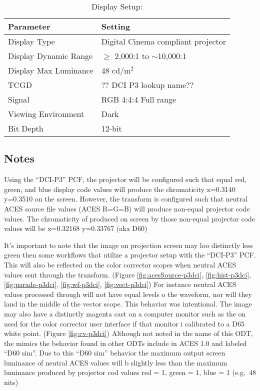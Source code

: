 \begin{table}[ht!]
    \centering
        \begin{tabular}{|p{1.5in}|p{3in}|}
            \hline
            \textbf{Parameter} 		& 	\textbf{Setting} 				 		\\ \hline
            Display Type 			&	Digital Cinema compliant projector 		\\ \hline
            Display Dynamic Range 	& 	$\geq$ 2,000:1 to $\sim$10,000:1 		\\ \hline
            Display Max Luminance 	& 	48 cd/m$^2$								\\ \hline
            TCGD 					& 	?? DCI P3 lookup name?? 				\\ \hline %
            Signal 					&	RGB 4:4:4 Full range 					\\ \hline
            Viewing Environment 	& 	Dark 									\\ \hline
            Bit Depth 				& 	12-bit 									\\ \hline 
    	\end{tabular}
    \caption{Display Setup: \shortName{}} 
    \label{tab:setup-\id}
\end{table}

\subsection{Notes}
\label{subsec:notes-\id}

Using the ``DCI-P3'' PCF, the projector will be configured such that equal red, green, and blue display code values will produce the chromaticity x=0.3140 y=0.3510 on the screen. However, the \transformID{} transform is configured such that neutral ACES source file values (ACES R=G=B) will produce non-equal projector code values. The chromaticity of produced on screen by those non-equal projector code values will be x=0.32168 y=0.33767 (aka D60) 

It's important to note that the image on projection screen may loo distinctly less green then some workflows that utilize a projector setup with the ``DCI-P3'' PCF. This will also be reflected on the color corrector scopes when neutral ACES values sent through the \transformID{} transform. (Figure \ref{fig:acesSource-p3dci}, \ref{fig:hist-p3dci}, \ref{fig:parade-p3dci}, \ref{fig:wf-p3dci}, \ref{fig:vect-p3dci}) For instance neutral ACES values processed through \transformID{} will not have equal levels o the waveform, nor will they land in the middle of the vector scope. This behavior was intentional. The image may also have a distinctly magenta cast on a computer monitor such as the on used for the color corrector user interface if that monitor i calibrated to a D65 white point. (Figure \ref{fig:cv-p3dci}) Although not noted in the name of this ODT, the mimics the behavior found in other ODTs include in ACES 1.0 and labeled ``D60 sim''. Due to this ``D60 sim'' behavior the maximum output screen luminance of neutral ACES values will b slightly less than the maximum luminance produced by projector cod values red = 1, green = 1, blue = 1 (e.g.~48 nits) 

